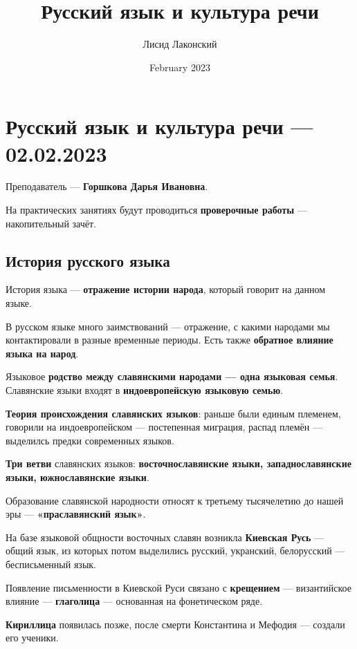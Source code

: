 \documentclass{article}
\title{Русский язык и культура речи}
\author{Лисид Лаконский}
\date{February 2023}
\begin{document}
\raggedright

\maketitle
\tableofcontents
\pagebreak

\section{Русский язык и культура речи — 02.02.2023}

Преподаватель — \textbf{Горшкова Дарья Ивановна}.

На практических занятиях будут проводиться \textbf{проверочные работы} — накопительный зачёт.

\subsection{История русского языка}

История языка — \textbf{отражение истории народа}, который говорит на данном языке.

В русском языке много заимствований — отражение, с какими народами мы контактировали в разные временные периоды. Есть также \textbf{обратное влияние языка на народ}.

Языковое \textbf{родство между славянскими народами — одна языковая семья}. Славянские языки входят в \textbf{индоевропейскую языковую семью}.

\textbf{Теория происхождения славянских языков}: раньше были единым племенем, говорили на индоевропейском — постепенная миграция, распад племён — выделилсь предки современных языков.

\textbf{Три ветви} славянских языков: \textbf{восточнославянские языки, западнославянские языки, южнославянские языки}.

Образование славянской народности относят к третьему тысячелетию до нашей эры — \textbf{«праславянский язык»}.

\hfill

На базе языковой общности восточных славян возникла \textbf{Киевская Русь} — общий язык, из которых потом выделились русский, укранский, белорусский — бесписьменный язык.

Появление письменности в Киевской Руси связано с \textbf{крещением} — византийское влияние — \textbf{глаголица} — основанная на фонетическом ряде.

\textbf{Кириллица} появилась позже, после смерти Константина и Мефодия — создали его ученики.
\end{document}
